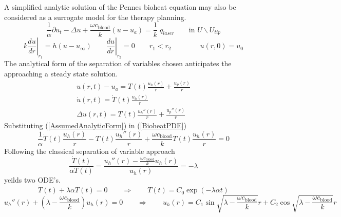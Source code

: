 \documentclass{article}         %
\theoremstyle{definition}
\theoremstyle{remark}
\newcommand{\eqn}[1]{(\ref{#1})}
\begin{document}
A simplified analytic solution of the Pennes bioheat equation 
may also be considered as a surrogate model for the therapy planning.
\begin{equation} \label{TransientAnalytic}
  \frac{1}{\alpha}
  \partial u_t   
 -\Delta u   
 + \frac{\omega c_\text{blood}}{k} (u  - u_a )
 = \frac{1}{k} \; q_{laser}
     \qquad \text{in } U \backslash U_{tip}
\end{equation}
\[
  \left. k  \frac{d u}{dr} \right|_{r_1}  = h (u - u_\infty) 
  \qquad
  \left. \frac{d u}{dr} \right|_{r_2}  = 0
  \qquad
   r_1 < r_2
  \qquad
  \qquad
   u(r,0) = u_0
\]
The analytical form of the separation of variables chosen anticipates the
approaching a steady state solution.
\begin{equation} \label{AssumedAnalyticForm}
\begin{split}
 u(r,t) - u_a = T(t) \frac{u_h(r)}{r} + \frac{u_p(r)}{r} 
\\
 \dot{u}(r,t)  = \dot{T}(t) \frac{u_h(r)}{r}
\\
 \Delta u(r,t)  = T(t) \frac{u_h''(r)}{r }+ \frac{u_p''(r)}{r} 
\end{split}
\end{equation}
Substituting \eqn{AssumedAnalyticForm} in \eqn{BioheatPDE}
\[
  \frac{1}{\alpha}
  \dot{T}(t) \frac{u_h(r)}{r}
 -
 T(t) \frac{u_h''(r)}{r }
 + \frac{\omega c_\text{blood}}{k} 
  T(t) \frac{u_h(r)}{r} 
 = 0
\]
Following the classical separation of variable approach
\[
  \frac{\dot{T}(t)}{\alpha T(t)}
   =
  \frac{u_h''(r)
       - \frac{\omega c_\text{blood}}{k} u_h(r) 
       }{u_h(r) }
   =
   - \lambda
\]
yeilds two ODE's.
\[
  \dot{T}(t)+ \lambda \alpha T(t)  = 0 
   \qquad \Rightarrow \qquad
   T(t)  = C_0 \exp\left( -\lambda \alpha t \right)
\]
\[
  u_h''(r) + ( \lambda - \frac{\omega c_\text{blood}}{k} )  u_h(r)  = 0 
   \qquad \Rightarrow \qquad
  u_h(r)   = C_1 \sin \sqrt{ \lambda - \frac{\omega c_\text{blood}}{k} } r
           + C_2 \cos \sqrt{ \lambda - \frac{\omega c_\text{blood}}{k} } r
\]
\end{document}
